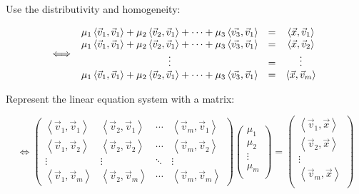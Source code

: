 \documentclass{article}
\newcommand{\lrangle}[1]{\left\langle #1 \right\rangle}
\begin{document}
Use the distributivity and homogeneity:

	\begin{equation}
		\iff
		\begin{array}{c c c}
			\mu _1 \lrangle{ \vec{v}_1, \vec{v}_1 } + \mu _2 \lrangle{ \vec{v}_2,
			  \vec{v}_1 } + \cdots + \mu _3 \lrangle{ \vec{v_3}, \vec{v}_1 } &
			= &
			\lrangle{ \vec{x}, \vec{v}_1 } \\
			\mu _1 \lrangle{ \vec{v}_1, \vec{v}_1 } + \mu _2 \lrangle{ \vec{v}_2,
			  \vec{v}_1 } + \cdots + \mu _3 \lrangle{ \vec{v_3}, \vec{v}_1 } &
			= &
			\lrangle{ \vec{x}, \vec{v}_2 } \\
			\vdots &
			= &
			\vdots \\
			\mu _1 \lrangle{ \vec{v}_1, \vec{v}_1 } + \mu _2 \lrangle{ \vec{v}_2,
			  \vec{v}_1 } + \cdots + \mu _3 \lrangle{ \vec{v_3}, \vec{v}_1 } &
			= &
			\lrangle{ \vec{x}, \vec{v}_m }
		\end{array}
	\end{equation}

Represent the linear equation system with a matrix:

	\begin{equation}
		\iff
		\begin{pmatrix}
			\lrangle{ \vec{v}_1, \vec{v}_1 } &
			\lrangle{ \vec{v}_2, \vec{v}_1 } &
			\cdots &
			\lrangle{ \vec{v}_m, \vec{v}_1 } \\
			\lrangle{ \vec{v}_1, \vec{v}_2 } &
			\lrangle{ \vec{v}_2, \vec{v}_2 } &
			\cdots &
			\lrangle{ \vec{v}_m, \vec{v}_2 } \\
			\vdots & \vdots & \ddots & \vdots \\
			\lrangle{ \vec{v}_1, \vec{v}_m } &
			\lrangle{ \vec{v}_2, \vec{v}_m } &
			\cdots &
			\lrangle{ \vec{v}_m, \vec{v}_m }
		\end{pmatrix}
		\begin{pmatrix}
			\mu _1 \\
			\mu _2 \\
			\vdots \\
			\mu _m \\
		\end{pmatrix}
		=
		\begin{pmatrix}
			\lrangle{ \vec{v}_1, \vec{x} } \\
			\lrangle{ \vec{v}_2, \vec{x} } \\
			\vdots \\
			\lrangle{ \vec{v}_m, \vec{x} } \\
		\end{pmatrix}
	\end{equation}
\end{document}
